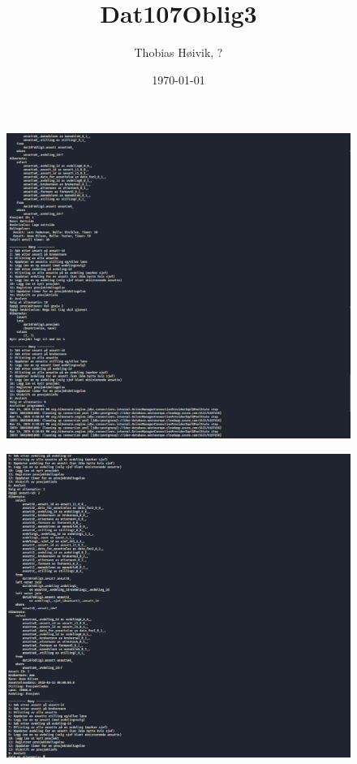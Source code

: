 \documentclass[12pt]{article}
\title{Dat107Oblig3}
\author{Thobias Høivik, ?}
\date{\today}
\begin{document}
\maketitle
\begin{figure}[ht]
    \centering
    \includegraphics[width=1\textwidth]{./img/Running1.PNG}
\end{figure}
\begin{figure}[ht]
    \centering
    \includegraphics[width=1\textwidth]{./img/Running2.PNG}
\end{figure}
\end{document}
